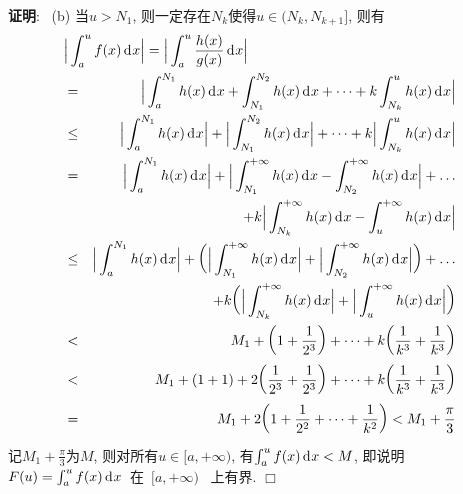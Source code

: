 \documentclass[a4paper,12pt,hyperref,twoside]{ctexart}
\newcommand\setcolsep[1][2]   %
    {\setlength\arraycolsep{#1pt}}
\newcommand{\dev}[2][]{{\,\textup{d}}^{#1}#2}   %
\numberwithin{equation}{section}
\newenvironment{proof}[1][\indent 证明]
    {\textbf {#1}:~}
    {\hfill $\Box$}
\begin{document}
\begin{proof}
(b) 当$u>N_1$, 则一定存在${N_k}$使得$u\in(N_k, N_{k+1}]$, 则有\setcolsep
\begin{eqnarray*}
\lefteqn{\Big\vert\int_a^uf(x)\dev x\Big\vert
=\Big\vert\int_{a}^{u}\frac{h(x)}{g(x)}\dev x\Big\vert}\\
&=&\Big\vert\int_{a}^{N_1}h(x)\dev x+ \int_{N_1}^{N_2}h(x)\dev x+\dots+k\int_{N_k}^uh(x)\dev x\Big\vert\\
&\le&\Big\vert\int_{a}^{N_1}h(x)\dev x\Big\vert +\Big\vert\int_{N_1}^{N_2}h(x)\dev x\Big\vert+\dots+ k\Big\vert\int_{N_k}^{u}h(x)\dev x\Big\vert\\
&=&\Big\vert\int_{a}^{N_1}h(x)\dev x\Big\vert +\Big\vert\int_{N_1}^{+\infty}h(x)\dev x- \int_{N_2}^{+\infty}h(x)\dev x\Big\vert+\dots \\&&\quad+k\Big\vert\int_{N_k}^{+\infty}h(x)\dev x -\int_{u}^{+\infty}h(x)\dev x\Big\vert\\
&\le&\Big\vert\int_{a}^{N_1}h(x)\dev x\Big\vert +\bigg(\Big\vert\int_{N_1}^{+\infty}h(x)\dev x\Big\vert +\Big\vert\int_{N_2}^{+\infty}h(x)\dev x\Big\vert\bigg)+\dots
\\ &&\quad+k\bigg(\Big\vert\int_{N_k}^{+\infty}h(x)\dev x\Big\vert +\Big\vert\int_{u}^{+\infty}h(x)\dev x\Big\vert\bigg)\\
&<&M_1+\bigg(1+\frac1{2^3}\bigg)+\cdots+k\bigg(\frac1{k^3}+\frac1{k^3}\bigg)\\
&<&M_1+(1+1)+2\bigg(\frac1{2^3}+\frac1{2^3}\bigg) +\dots+k\bigg(\frac1{k^3}+\frac1{k^3}\bigg)\\
&=& M_1+2\bigg(1+\frac1{2^2}+\dots+\frac1{k^2}\bigg)< M_1+\frac\pi3
\end{eqnarray*}
记$M_1+\frac\pi3$为$M$, 则对所有$u\in[a, +\infty)$, 有$\int_a^uf(x)\dev x<M$, 即说明~$F(u)=\int_{a}^{u}f(x)\dev x$~在~$[a, +\infty)$~ 上有界.
\end{proof}
\end{document}

